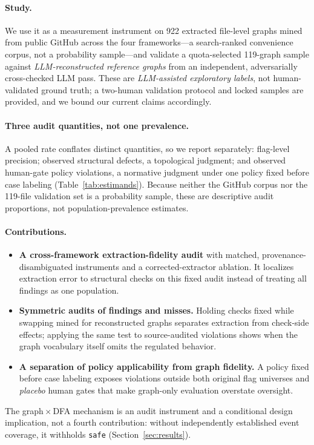 \paragraph{Study.}
We use it as a measurement instrument on 922 extracted
file-level graphs mined from public GitHub across the four frameworks---a
search-ranked convenience corpus, not a probability sample---and validate a
quota-selected 119-graph sample against \emph{LLM-reconstructed reference
graphs} from an independent, adversarially cross-checked LLM pass. These are
\emph{LLM-assisted exploratory labels}, not human-validated ground truth; a
two-human validation protocol and locked samples are provided, and we bound our
current claims accordingly.

\paragraph{Three audit quantities, not one prevalence.}
A pooled rate conflates distinct quantities, so we report separately:
flag-level precision; observed structural defects, a topological judgment; and
observed human-gate policy violations, a normative judgment under one policy
fixed before case labeling (Table~\ref{tab:estimands}). Because neither the
GitHub corpus nor the 119-file validation set is a probability sample, these are
descriptive audit proportions, not population-prevalence estimates.

\paragraph{Contributions.}
\begin{itemize}\itemsep1pt
  \item \textbf{A cross-framework extraction-fidelity audit} with matched,
  provenance-disambiguated instruments and a corrected-extractor ablation. It
  localizes extraction error to structural checks on this fixed audit instead
  of treating all findings as one population.
  \item \textbf{Symmetric audits of findings and misses.} Holding checks fixed
  while swapping mined for reconstructed graphs separates extraction from
  check-side effects; applying the same test to source-audited violations shows
  when the graph vocabulary itself omits the regulated behavior.
  \item \textbf{A separation of policy applicability from graph fidelity.} A
  policy fixed before case labeling exposes violations outside both original
  flag universes and \emph{placebo} human gates that make graph-only evaluation
  overstate oversight.
\end{itemize}
The graph\,$\times$\,DFA mechanism is an audit instrument and a conditional
design implication, not a fourth contribution: without independently
established event coverage, it withholds \texttt{safe}
(Section~\ref{sec:results}).
